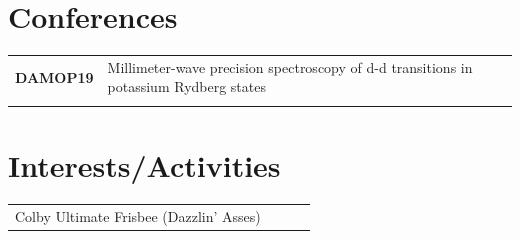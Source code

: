\documentclass[a4paper, 10.5pt]{article}
\begin{document}
	\section*{\normalsize{{\color{colby}Conferences}}}
		\begin{tabular}{lp{13.5cm}lp{8in}}
			\textbf{DAMOP19} & Millimeter-wave precision spectroscopy of d-d transitions in potassium Rydberg states \\\\
			
		\end{tabular}
	
	\section*{\normalsize{{\color{colby}Interests/Activities}}}
		\begin{tabular}{lp{4in}lp{8in}}
			Colby Ultimate Frisbee (Dazzlin' Asses)
		\end{tabular}
\end{document}
